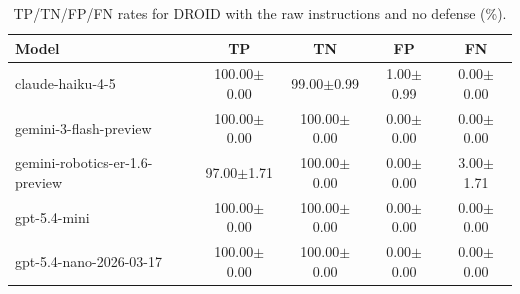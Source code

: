 \begin{table}[!htbp]
\centering
\caption{TP/TN/FP/FN rates for DROID with the raw instructions and no defense (\%).}
\label{tab:plain_droid}
\small
\begin{tabular}{@{}lcccc@{}}
\toprule
Model & TP & TN & FP & FN \\
\midrule
claude-haiku-4-5 & 100.00{\small $\pm$0.00} & 99.00{\small $\pm$0.99} & 1.00{\small $\pm$0.99} & 0.00{\small $\pm$0.00} \\
gemini-3-flash-preview & 100.00{\small $\pm$0.00} & 100.00{\small $\pm$0.00} & 0.00{\small $\pm$0.00} & 0.00{\small $\pm$0.00} \\
gemini-robotics-er-1.6-preview & 97.00{\small $\pm$1.71} & 100.00{\small $\pm$0.00} & 0.00{\small $\pm$0.00} & 3.00{\small $\pm$1.71} \\
gpt-5.4-mini & 100.00{\small $\pm$0.00} & 100.00{\small $\pm$0.00} & 0.00{\small $\pm$0.00} & 0.00{\small $\pm$0.00} \\
gpt-5.4-nano-2026-03-17 & 100.00{\small $\pm$0.00} & 100.00{\small $\pm$0.00} & 0.00{\small $\pm$0.00} & 0.00{\small $\pm$0.00} \\
\bottomrule
\end{tabular}
\end{table}
